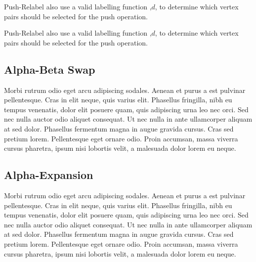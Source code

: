 \begin{definition}
	Push-Relabel also use a valid labelling function ,$d$, to determine which vertex pairs should be selected for the push operation.
\end{definition}

\begin{definition}
	Push-Relabel also use a valid labelling function ,$d$, to determine which vertex pairs should be selected for the push operation.
\end{definition}


\subsection{Alpha-Beta Swap}
Morbi rutrum odio eget arcu adipiscing sodales. Aenean et purus a est pulvinar pellentesque. Cras in elit neque, quis varius elit. Phasellus fringilla, nibh eu tempus venenatis, dolor elit posuere quam, quis adipiscing urna leo nec orci. Sed nec nulla auctor odio aliquet consequat. Ut nec nulla in ante ullamcorper aliquam at sed dolor. Phasellus fermentum magna in augue gravida cursus. Cras sed pretium lorem. Pellentesque eget ornare odio. Proin accumsan, massa viverra cursus pharetra, ipsum nisi lobortis velit, a malesuada dolor lorem eu neque.


\subsection{Alpha-Expansion}
Morbi rutrum odio eget arcu adipiscing sodales. Aenean et purus a est pulvinar pellentesque. Cras in elit neque, quis varius elit. Phasellus fringilla, nibh eu tempus venenatis, dolor elit posuere quam, quis adipiscing urna leo nec orci. Sed nec nulla auctor odio aliquet consequat. Ut nec nulla in ante ullamcorper aliquam at sed dolor. Phasellus fermentum magna in augue gravida cursus. Cras sed pretium lorem. Pellentesque eget ornare odio. Proin accumsan, massa viverra cursus pharetra, ipsum nisi lobortis velit, a malesuada dolor lorem eu neque.